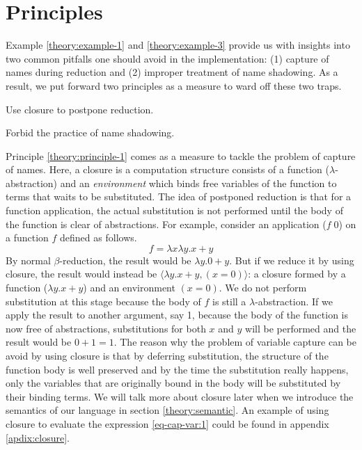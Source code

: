 \section{Principles}
Example \ref{theory:example-1} and \ref{theory:example-3} provide us with insights into two common pitfalls one should avoid in the implementation: (1) capture of names during reduction and (2) improper treatment of name shadowing. As a result, we put forward two principles as a measure to ward off these two traps.
\begin{principle}\label{theory:principle-1}
  Use closure to postpone reduction.
\end{principle}
\begin{principle}\label{theory:principle-2}
  Forbid the practice of name shadowing.
\end{principle}
Principle \ref{theory:principle-1} comes as a measure to tackle the problem of capture of names. Here, a closure is a computation structure consists of a function ($\lambda$-abstraction) and an \emph{environment} which binds free variables of the function to terms that waits to be substituted. The idea of postponed reduction is that for a function application, the actual substitution is not performed until the body  of the function is clear of abstractions. For example, consider an application ($f\;0$) on a function $f$ defined as follows.
\[ f = \lambda x \lambda y.x + y \]
By normal $\beta$-reduction, the result would be $\lambda y.0 + y$. But if we reduce it by using closure, the result would instead be $\langle{\lambda y. x+y, (x = 0)}\rangle$: a closure formed by a function ($\lambda y.x+y$) and an environment $(x = 0)$. We do not perform substitution at this stage because the body of $f$ is still a $\lambda$-abstraction. If we apply the result to another argument, say 1, because the body of the function is now free of abstractions, substitutions for both $x$ and $y$ will be performed and the result would be $0 + 1 = 1$. The reason why the problem of variable capture can be avoid by using closure is that by deferring substitution, the structure of the function body is well preserved and by the time the substitution really happens, only the variables that are originally bound in the body will be substituted by their binding terms. We will talk more about closure later when we introduce the semantics of our language in section \ref{theory:semantic}. An example of using closure to evaluate the expression \ref{eq-cap-var:1} could be found in appendix \ref{apdix:closure}.

